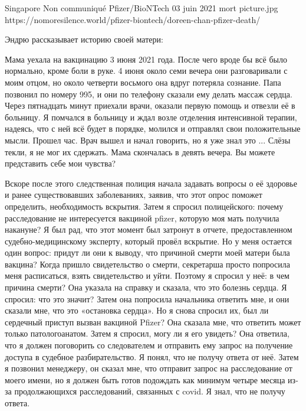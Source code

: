           {Singapore}
          {Non communiqué}
          {Pfizer/BioNTech}
          {03 juin 2021}
          {mort}
          {picture.jpg}
          {https://nomoresilence.world/pfizer-biontech/doreen-chan-pfizer-death/}
          {

Эндрю рассказывает историю своей матери:

Мама уехала на вакцинацию 3 июня 2021 года. После чего вроде бы всё было
нормально, кроме боли в руке. 4 июня около семи вечера они разговаривали с моим
отцом, но около четверти восьмого она вдруг потеряла сознание. Папа позвонил по
номеру 995, и они по телефону сказали ему делать массаж сердца. Через пятнадцать
минут приехали врачи, оказали первую помощь и отвезли её в больницу. Я помчался
в больницу и ждал возле отделения интенсивной терапии, надеясь, что с ней всё
будет в порядке, молился и отправлял свои положительные мысли. Прошел час. Врач
вышел и начал говорить, но я уже знал это ... Слёзы текли, я не мог их
сдержать. Мама скончалась в девять вечера. Вы можете представить себе мои
чувства?

Вскоре после этого следственная полиция начала задавать вопросы о её здоровье и
ранее существовавших заболеваниях, заявив, что этот опрос поможет определить,
необходимость вскрытия. Затем я спросил полицейского: почему расследование не
интересуется вакциной pfizer, которую моя мать получила накануне? Я был рад, что
этот момент был затронут в отчете, предоставленном судебно-медицинскому
эксперту, который провёл вскрытие. Но у меня остается один вопрос: придут ли они
к выводу, что причиной смерти моей матери была вакцина? Когда пришло
свидетельство о смерти, секретарша просто попросила меня расписаться, взять
свидетельство и уйти. Поэтому я спросил у неё: в чем причина смерти? Она указала
на справку и сказала, что это болезнь сердца. Я спросил: что это значит? Затем
она попросила начальника ответить мне, и они сказали мне, что это «остановка
сердца». Но я снова спросил их, был ли сердечный приступ вызван вакциной Pfizer?
Она сказала мне, что ответить может только патологоанатом. Затем я спросил, могу
ли я его увидеть? Она ответила, что я должен поговорить со следователем и
отправить ему запрос на получение доступа в судебное разбирательство. Я понял,
что не получу ответа от неё. Затем я позвонил менеджеру, он сказал мне, что
отправит запрос на расследование от моего имени, но я должен быть готов
подождать как минимум четыре месяца из-за продолжающихся расследований,
связанных с covid. Я знал, что не получу ответа.

}
